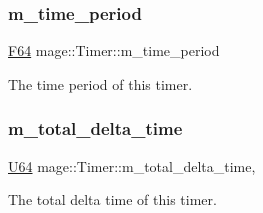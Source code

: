 \subsubsection{\texorpdfstring{m\+\_\+time\+\_\+period}{m\_time\_period}}
{\footnotesize\ttfamily \hyperlink{namespacemage_ad26233bbec640deda836e572c1a23708}{F64} mage\+::\+Timer\+::m\+\_\+time\+\_\+period\hspace{0.3cm}{\ttfamily [private]}}

The time period of this timer. \hypertarget{classmage_1_1_timer_a597eae6b756d0f50bcb1541db0f1c7f0}{}\label{classmage_1_1_timer_a597eae6b756d0f50bcb1541db0f1c7f0} 
\subsubsection{\texorpdfstring{m\+\_\+total\+\_\+delta\+\_\+time}{m\_total\_delta\_time}}
{\footnotesize\ttfamily \hyperlink{namespacemage_a6672cf3c861707ce4a3235a3eb43941d}{U64} mage\+::\+Timer\+::m\+\_\+total\+\_\+delta\+\_\+time\hspace{0.3cm}{\ttfamily [mutable]}, {\ttfamily [private]}}

The total delta time of this timer. 